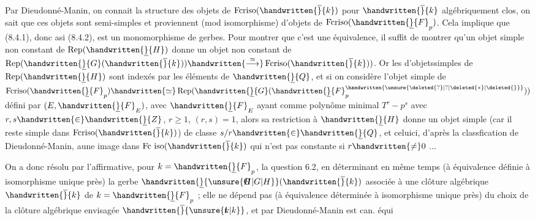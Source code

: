 Par Dieudonné-Manin, on connait la structure des objets de $\operatorname{Fcriso}(\handwritten{\overline}{k})$ pour $\handwritten{\overline}{k}$ algébriquement clos, on sait que ces objets sont semi-simples et proviennent (mod isomorphisme) d'objets de $\operatorname{Fcriso}(\handwritten{\underline}{F}_p)$. Cela implique que (8.4.1), donc asi (8.4.2), est un monomorphisme de gerbes. Pour montrer que c'est une équivalence, il suffit de montrer qu'un objet simple non constant de  $\operatorname{Rep}(\handwritten{\underline}{H})$ donne un objet non constant de $\operatorname{Rep}(\handwritten{\underline}{G}(\handwritten{\overline}{k}))\handwritten{\overset{\approx}{\longrightarrow}}\operatorname{Fcriso}(\handwritten{\overline}{k}))$. Or les  d'objetssimples de $\operatorname{Rep}(\handwritten{\underline}{H})$ sont indexés par les éléments de $\handwritten{\underline}{Q}$, et si on considère l'objet simple de $\operatorname{Fcriso}(\handwritten{\underline}{F}_p)\handwritten{\simeq}\operatorname{Rep}(\handwritten{\underline}{G}(\handwritten{\underline}{F}_p^{\handwritten{\unsure{\deleted{?}|?|\deleted{*}|\deleted{\overline{\vphantom{F}}}}}}))$ défini par $(E,\handwritten{\underline}{F}_E)$, avec $\handwritten{\underline}{F}_E$ ayant comme polynôme minimal $T^r-p^s$ avec $r,s\handwritten{\in}\handwritten{\underline}{Z}$, $r\geq1$, $(r,s)=1$, alors sa restriction à $\handwritten{\underline}{H}$ donne un objet simple  (car il reste simple dans $\operatorname{Fcriso}(\handwritten{\overline}{k})$) de classe $s/r\handwritten{\in}\handwritten{\underline}{Q}$, et celui\unsure{\rlap{(}\handwritten{-}|\handwritten{-}}ci, d'après la classfication de Dieudonné-Manin,  aune image dans $\operatorname{Fc\ iso}(\handwritten{\overline}{k})$ qui n'est pas constante si $r\handwritten{\ne}0$ ...

 On a donc  résolu par l'affirmative, pour $k=\handwritten{\underline}{F}_p$, la question 6.2, en déterminant en même temps (à équivalence définie à isomorphisme unique près) la gerbe $\handwritten{\underline}{\unsure{\rlap{G}H|G|H}}(\handwritten{\overline}{k})$ associée à une clôture algébrique $\handwritten{\overline}{k}$ de $k=\handwritten{\underline}{F}_p$ ;  elle ne dépend pas (à  équivalence déterminée à isomorphisme unique près) du choix de la clôture algébrique envisagée $\handwritten{\overline}{\unsure{\rlap{t}k|k}}$, et par Dieudonné-Manin est can. équi%

